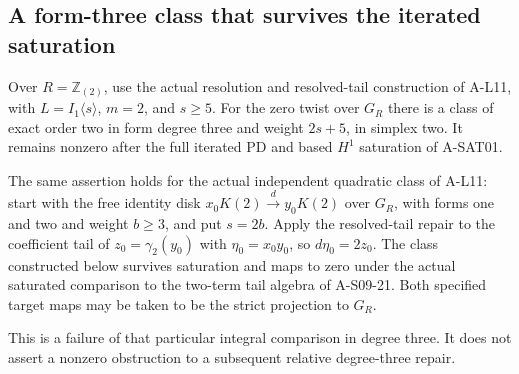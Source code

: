 \subsection{A form-three class that survives the iterated saturation}

\begin{proposition}
\label{AS0922}
Over $R=\mathbb Z_{(2)}$, use the actual resolution and
resolved-tail construction of A-L11, with
$L=I_1\langle s\rangle$, $m=2$, and $s\geq5$.
For the zero twist over $G_R$ there is a class of exact
order two in form degree three and weight $2s+5$, in
simplex two.  It remains nonzero after the full iterated
PD and based $H^1$ saturation of A-SAT01.

The same assertion holds for the actual independent
quadratic class of A-L11: start with the free identity
disk $x_0K(2)\xrightarrow{d}y_0K(2)$ over $G_R$,
with forms one and two and weight $b\geq3$, and put
$s=2b$.  Apply the resolved-tail repair to the coefficient
tail of $z_0=\gamma_2(y_0)$ with
$\eta_0=x_0y_0$, so $d\eta_0=2z_0$.
The class constructed below survives saturation and maps
to zero under the actual saturated comparison to the
two-term tail algebra of A-S09-21.
Both specified target maps may be taken to be the strict
projection to $G_R$.

This is a failure of that particular integral comparison
in degree three.  It does not assert a nonzero obstruction
to a subsequent relative degree-three repair.
\end{proposition}

